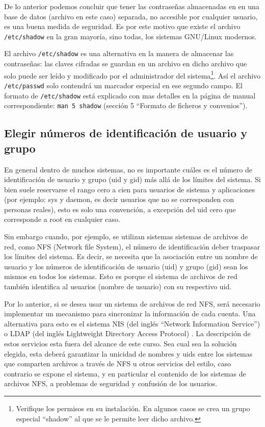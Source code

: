 \documentclass[12pt]{article}
\begin{document}
De lo anterior podemos concluir que tener las contraseñas almacenadas en 
en una base de datos (archivo en este caso) separada, 
no accesible por cualquier usuario, es una buena medida de seguridad. Es por este motivo 
que existe el archivo \texttt{/etc/shadow} en la gran mayoría, sino todas, los sistemas
GNU/Linux modernos.  

El archivo \texttt{/etc/shadow} es una alternativa en la manera de
almacenar las contraseñas: las claves cifradas se guardan en un archivo
en dicho archivo que solo puede ser leído y modificado por el administrador del 
sistema\footnote{Verifique los permisos en su instalación. En algunos casos se crea 
un grupo especial ``shadow'' al que se le permite leer dicho archivo.}. Así el 
archivo \texttt{/etc/passwd} solo contendrá un marcador especial en ese segundo campo. 
El formato de \texttt{/etc/shadow} está explicado con mas detalles en la página de 
manual correspondiente: \texttt{man 5 shadow} (sección 5 ``Formato de ficheros y convenios'').


\subsection{Elegir números de identificación de usuario y grupo}
En general dentro de muchos sistemas, no es importante cuáles es el número de 
identificación de usuario y grupo (uid y gid) más allá de los límites del sistema. 
Si bien suele reservarse el rango cero a cien 
para usuarios de sistema y aplicaciones (por ejemplo: sys y daemon, es decir usuarios 
que no se corresponden con personas reales), esto es solo una convención, 
a excepción del uid cero que corresponde a root en cualquier caso.  

Sin embargo cuando, por ejemplo, se utilizan sistemas sistemas de archivos de red, como 
NFS (Network file System), el número de identificación deber traspasar
los límites del sistema. Es decir, se necesita que la asociación entre un nombre de 
usuario y los números de identificación de usuario (uid) y grupo (gid) sean los mismos en todos
los sistemas. Esto es porque el sistema de archivos de red también identifica al
usuarios (nombre de usuario) con su respectivo uid.  

Por lo anterior, si se desea usar un sistema de archivos de red NFS,
será necesario implementar un mecanismo 
para sincronizar la información de cada cuenta. Una alternativa para esto 
es el sistema NIS (del inglés ``Network Information Service'') o LDAP (del inglés Lightweight 
Directory Access Protocol) . La descripción de estos servicios 
esta fuera del alcance de este curso. Sea cual sea la solución elegida, esta deberá 
garantizar la unicidad de nombres y uids entre los sistemas que comparten 
archivos a través de NFS u otros servicios del estilo, caso contrario se expone
el sistema, y en particular el contenido de los sistemas de archivos NFS, a 
problemas de seguridad y confusión de los usuarios. 
\end{document}
